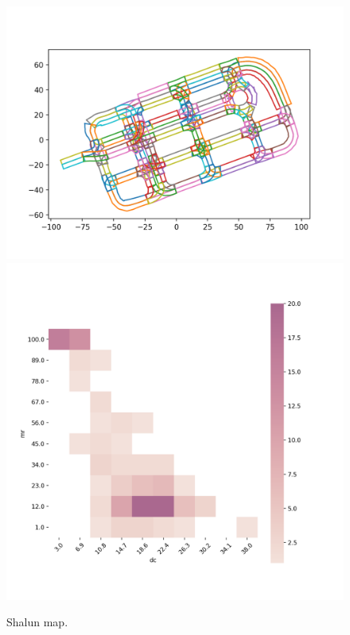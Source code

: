 \documentclass[conference]{IEEEtran}
\begin{document}
\begin{figure}[!tp]
  \includegraphics[width=\linewidth]{images/map_shalun}
  \includegraphics[width=\linewidth]{images/feature_shalun}
  \caption{Shalun map.}
    \label{fig:feature-maps-shalun}
\endminipage 
\hfill
\end{figure}
\end{document}
